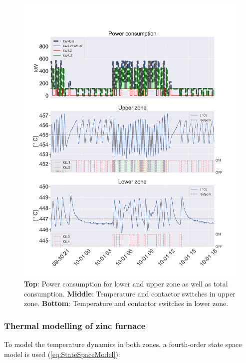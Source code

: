 \documentclass[lettersize,journal]{IEEEtran}
\begin{document}
\begin{figure}[!t]
    \centering
    \includegraphics[width=\columnwidth]{figures/data_visualization.png}
    \caption{\textbf{Top}: Power consumption for lower and upper zone as well as total consumption. \textbf{Middle}: Temperature and contactor switches in upper zone. \textbf{Bottom}: Temperature and contactor switches in lower zone.}
    \label{fig:data_visualization}
\end{figure}

\subsubsection{Thermal modelling of zinc furnace}

To model the temperature dynamics in both zones, a fourth-order state space model is used (\ref{eq:StateSpaceModel}):
\end{document}
